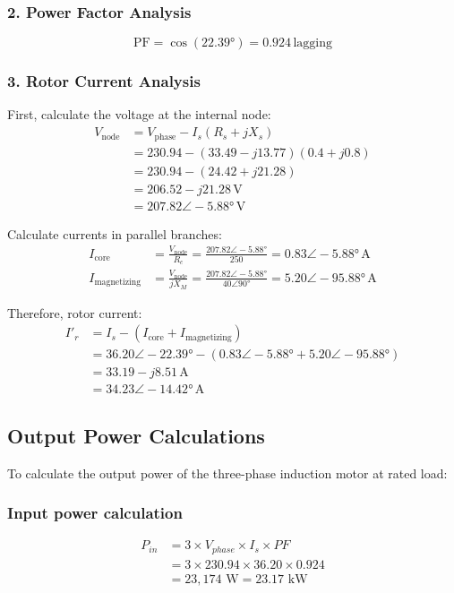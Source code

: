 \documentclass[a4paper,12pt]{IEEEtran}
\begin{document}
\subsubsection{2. Power Factor Analysis}
\begin{equation}
    \text{PF} = \cos(22.39°) = 0.924\,\text{lagging}
\end{equation}

\subsubsection{3. Rotor Current Analysis}
First, calculate the voltage at the internal node:
\begin{align}
    V_{\text{node}} &= V_{\text{phase}} - I_s(R_s + jX_s) \\
    &= 230.94 - (33.49 - j13.77)(0.4 + j0.8) \\
    &= 230.94 - (24.42 + j21.28) \\
    &= 206.52 - j21.28\,\text{V} \\
    &= 207.82\angle -5.88°\,\text{V}
\end{align}

Calculate currents in parallel branches:
\begin{align}
    I_{\text{core}} &= \frac{V_{\text{node}}}{R_c} = \frac{207.82\angle -5.88°}{250} = 0.83\angle -5.88°\,\text{A} \\
    I_{\text{magnetizing}} &= \frac{V_{\text{node}}}{jX_M} = \frac{207.82\angle -5.88°}{40\angle 90°} = 5.20\angle -95.88°\,\text{A}
\end{align}

Therefore, rotor current:
\begin{align}
    I'_r &= I_s - (I_{\text{core}} + I_{\text{magnetizing}}) \\
    &= 36.20\angle -22.39° - (0.83\angle -5.88° + 5.20\angle -95.88°) \\
    &= 33.19 - j8.51\,\text{A} \\
    &= 34.23\angle -14.42°\,\text{A}
\end{align}
\subsection{Output Power Calculations}

To calculate the output power of the three-phase induction motor at rated load:

\subsubsection{Input power calculation}
\begin{align}
    P_{in} &= 3 \times V_{phase} \times I_s \times PF \\
    &= 3 \times 230.94 \times 36.20 \times 0.924 \\
    &= 23,174 \text{ W} = 23.17 \text{ kW}
\end{align}
\end{document}
